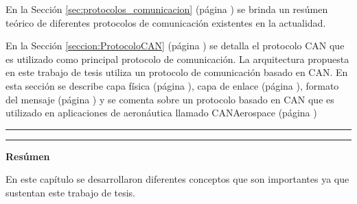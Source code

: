 En la Sección \ref{sec:protocolos_comunicacion} (página \pageref{sec:protocolos_comunicacion})
se brinda un resúmen teórico de diferentes protocolos de comunicación existentes en la actualidad.

En la Sección \ref{seccion:ProtocoloCAN} (página \pageref{seccion:ProtocoloCAN}) se detalla el
protocolo CAN que es utilizado como principal protocolo de comunicación. La arquitectura propuesta
en este trabajo de tesis utiliza un protocolo de comunicación basado en CAN. En esta sección se describe capa física (página \pageref{subsec:capafisca}), capa de enlace (página \pageref{subsec:capa_enlace}), formato del mensaje (página \pageref{subsec:formato_mensaje}) y se comenta sobre un protocolo basado en CAN que es utilizado en aplicaciones de aeronáutica llamado CANAerospace (página \pageref{subsec:CANaerospace})

\upshape

\noindent\rule{\textwidth}{2pt}
\vspace{1cm}















\vspace{1cm}
\noindent\rule{\textwidth}{2pt}

\textbf{\Large{Resúmen}}

En este capítulo se desarrollaron diferentes conceptos que son importantes ya que sustentan
este trabajo de tesis.


